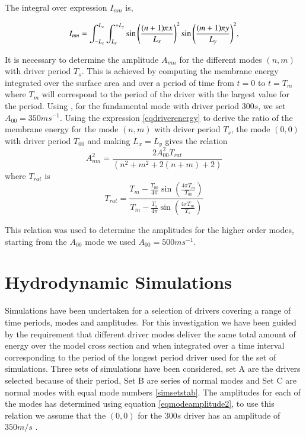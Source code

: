 \documentclass{aa}
\begin{document}
The integral over expression $I_{nm}$ is,

\begin{equation}\label{eqdriverenergyintegral}
I_{nm}=  \int_{-L_{x}}^{L_{x}} \int_{L_{y}}^{+L_{y}} \sin{\left(  {(n+1)\pi x}\over{L_x} \right)}^{2}   \sin{\left(  {(m+1)\pi y}\over{L_y} \right)}^{2}   ,
\end{equation}

It is necessary to determine the amplitude $A_{mn}$ for the different modes $(n,m)$ with driver period $T_{s}$. This is achieved by computing the membrane energy integrated over the surface area and over a period of time from $t=0$ to $t=T_{m}$ where $T_m$ will correspond to the period of the driver with the largest value for the period.
Using   \cite{Leighton1960} , for the fundamental mode with driver period $300s$, we set $A_{00}=350ms^{-1}$. 
Using the expression \eqref{eqdriverenergy} to derive the ratio of the membrane energy for the mode $(n,m)$ with driver period $T_{s}$, the mode $(0,0)$ with driver period $T_{00}$ and making $L_x=L_y$ gives the relation
\begin{equation}\label{eqmodeamplitude2}
A_{nm}^{2}=\frac{2A_{00}^{2}T_{rat}}{(n^2+m^2+2(n+m)+2)}
\end{equation}
where $T_{rat}$ is
\begin{equation}\label{eqtrat}
T_{rat}=
\frac{T_m-\frac{T_{00}}{4\pi}   \sin(\frac{4\pi T_m}{T_{00}})    }{T_m-\frac{T_{s}}{4\pi}   \sin(\frac{4\pi T_m}{T_{s}})  }
\end{equation}

This relation was used to determine the amplitudes for the higher order modes, starting from the $A_{00}$ mode we used  $A_{00}=500ms^{-1}$.



\section{Hydrodynamic Simulations}
Simulations have been undertaken for a selection of drivers covering a range of time periods, modes and amplitudes. For this investigation we have been guided by the requirement that  different driver modes deliver the same total amount of energy over the model cross section and when integrated over a time interval corresponding to the period of the longest period driver used for the set of simulations. Three sets of simulations have been considered, set A are the drivers selected because of their period, Set B are series of normal modes and Set C  are normal modes with equal mode numbers \ref{simsetstab}. The amplitudes for each of the modes has determined using  equation \eqref{eqmodeamplitude2}, to use this relation we assume that the $(0,0)$ for the $300s$ driver has an amplitude of $350m/s$ \cite{Leighton1960}.
\end{document}
